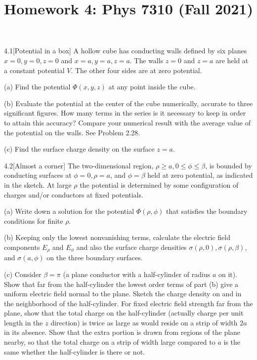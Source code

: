\documentclass[12pt]{article}
\title{Homework 4: Phys 7310 (Fall 2021)}
\begin{document}
\maketitle
\begin{problem}{4.1}[Potential in a box]
A hollow cube has conducting walls defined by six planes $x=0,y=0,z=0$ and
$x=a,y=a,z=a$. The walls $z=0$ and $z=a$ are held at a constant potential $V$.
The other four sides are at zero potential.

(a) Find the potential $\Phi(x,y,z)$ at any point inside the cube.

(b) Evaluate the potential at the center of the cube numerically, accurate to
three significant figures. How many terms in the series is it necessary to keep
in order to attain this accuracy? Compare your numerical result with the average
value of the potential on the walls. See Problem 2.28.

(c) Find the surface charge density on the surface $z=a$.
\begin{solution}
\end{solution}
\end{problem}
\begin{problem}{4.2}[Almost a corner]
The two-dimensional region, $\rho\geq a,0\leq\phi\leq\beta$, is bounded by
conducting surfaces at $\phi=0,\rho=a$, and $\phi=\beta$ held at zero potential,
as indicated in the sketch. At large $\rho$ the potential is determined by some
configuration of charges and/or conductors at fixed potentials.

(a) Write down a solution for the potential $\Phi(\rho,\phi)$ that satisfies the
boundary conditions for finite $\rho$.

(b) Keeping only the lowest nonvanishing terms, calculate the electric field
components $E_\rho$ and $E_\phi$ and also the surface charge densities
$\sigma(\rho,0),\sigma(\rho,\beta)$, and $\sigma(a,\phi)$ on the three boundary
surfaces.

(c) Consider $\beta=\pi$ (a plane conductor with a half-cylinder of radius $a$
on it). Show that far from the half-cylinder the lowest order terms of part (b)
give a uniform electric field normal to the plane. Sketch the charge density on
and in the neighborhood of the half-cylinder. For fixed electric field strength
far from the plane, show that the total charge on the half-cylinder (actually
charge per unit length in the $z$ direction) is twice as large as would reside
on a strip of width $2a$ in its absence. Show that the extra portion is drawn
from regions of the plane nearby, so that the total charge on a strip of width
large compared to $a$ is the same whether the half-cylinder is there or not.
\begin{solution}
\end{solution}
\end{problem}
\end{document}
